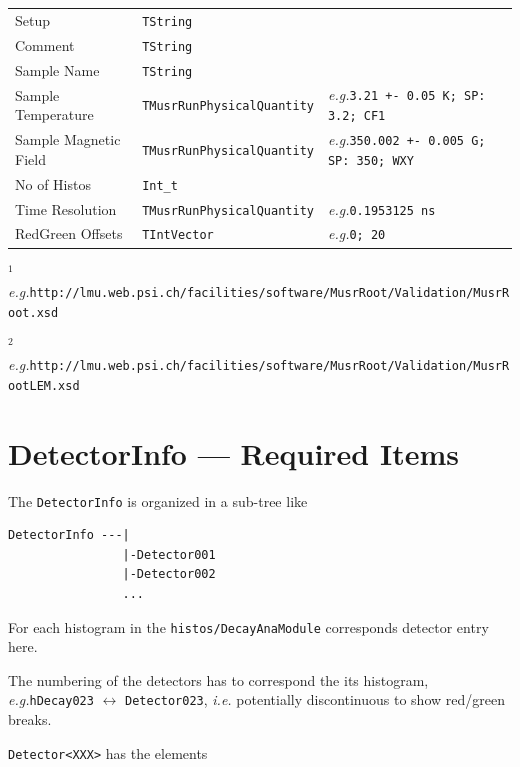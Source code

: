 \documentclass[twoside]{article}
\newcommand{\ie}{\emph{i.e.}\xspace}
\newcommand{\eg}{\emph{e.g.}\xspace}
\newcommand{\redgreen}{\color{red}red\color{black}/\color{green}green\color{black}\xspace}
\newcommand{\tstring}{\texttt{TString}\xspace}
\newcommand{\tintvec}{\texttt{TIntVector}\xspace}
\newcommand{\tquant}{\texttt{TMusrRunPhysicalQuantity}\xspace}
\begin{document}
\begin{small}
\begin{tabular}{l|l|l}
Setup          & \tstring      & \\
Comment        & \tstring      & \\
Sample Name    & \tstring      & \\
Sample Temperature & \tquant    & \eg \verb!3.21 +- 0.05 K; SP: 3.2; CF1! \\
Sample Magnetic Field & \tquant & \eg \verb!350.002 +- 0.005 G; SP: 350; WXY! \\
No of Histos   & \verb!Int_t!  & \\
Time Resolution & \tquant       & \eg \verb!0.1953125 ns! \\
RedGreen Offsets & \tintvec & \eg \verb!0; 20! \\
\end{tabular}

\vspace{5mm}

\noindent $^1$ \eg \verb!http://lmu.web.psi.ch/facilities/software/MusrRoot/Validation/MusrRoot.xsd!

\noindent $^2$ \eg \verb!http://lmu.web.psi.ch/facilities/software/MusrRoot/Validation/MusrRootLEM.xsd!
\end{small}

\section{DetectorInfo --- Required Items} \label{sec:DetectorInfoRequired}

The \texttt{DetectorInfo} is organized in a sub-tree like

\begin{verbatim}
DetectorInfo ---|
                |-Detector001
                |-Detector002
                ...                
\end{verbatim}

\noindent For each histogram in the \verb!histos/DecayAnaModule! corresponds detector entry here. 

\noindent The numbering of the detectors has to correspond the its histogram, \eg \verb!hDecay023! $\leftrightarrow$ \verb!Detector023!, \ie potentially discontinuous to show \redgreen breaks.

\vspace{2mm}

\noindent \verb!Detector<XXX>! has the elements

\vspace{2mm}
\end{document}
